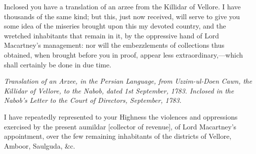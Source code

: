 Inclosed you have a translation of an arzee from the Killidar of Vellore. I have thousands of the same kind; but this, just now received, will serve to give you some idea of the miseries brought upon this my devoted country, and the wretched inhabitants that remain in it, by the oppressive hand of Lord Macartney's management: nor will the embezzlements of collections thus obtained, when brought before you in proof, appear less extraordinary,—which shall certainly be done in due time.

\PRLsep

\textit{Translation of an Arzee, in the Persian Language, from Uzzim-ul-Doen Cawn, the Killidar of Vellore, to the Nabob, dated 1st September, 1783. Inclosed in the Nabob's Letter to the Court of Directors, September, 1783.}
\vspace{0.3cm}

I have repeatedly represented to your Highness the violences and oppressions exercised by the present aumildar [collector of revenue], of Lord Macartney's appointment, over the few remaining inhabitants of the districts of Vellore, Amboor, Saulguda, \&c.

